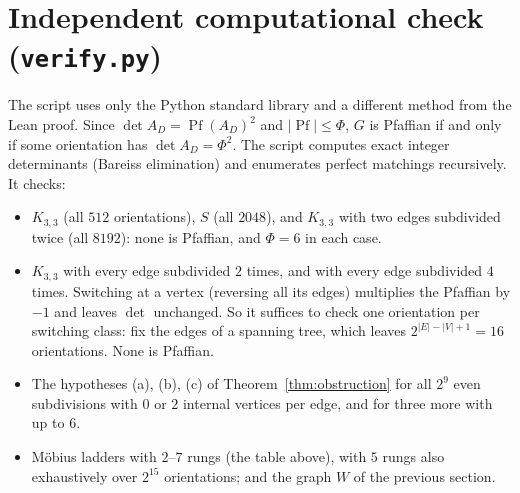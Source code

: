 \documentclass[11pt]{article}
\theoremstyle{definition}
\theoremstyle{remark}
\begin{document}
\section{Independent computational check (\texttt{verify.py})}
The script uses only the Python standard library and a different method from the
Lean proof. Since $\det A_D=\operatorname{Pf}(A_D)^2$ and $|\operatorname{Pf}|\le\Phi$, $G$ is
Pfaffian if and only if some orientation has $\det A_D=\Phi^2$. The script computes
exact integer determinants (Bareiss elimination) and enumerates perfect matchings
recursively. It checks:
\begin{itemize}
\item $K_{3,3}$ (all $512$ orientations), $S$ (all $2048$), and $K_{3,3}$ with two
edges subdivided twice (all $8192$): none is Pfaffian, and $\Phi=6$ in each case.
\item $K_{3,3}$ with every edge subdivided $2$ times, and with every edge subdivided
$4$ times. Switching at a vertex (reversing all its edges) multiplies the
Pfaffian by $-1$ and leaves $\det$ unchanged. So it suffices to check one
orientation per switching class: fix the edges of a spanning tree, which leaves
$2^{|E|-|V|+1}=16$ orientations. None is Pfaffian.
\item The hypotheses (a), (b), (c) of Theorem~\ref{thm:obstruction} for all $2^9$ even
subdivisions with $0$ or $2$ internal vertices per edge, and for three more with
up to $6$.
\item M\"obius ladders with $2$--$7$ rungs (the table above), with $5$ rungs also
exhaustively over $2^{15}$ orientations; and the graph $W$ of the previous
section.
\end{itemize}
\end{document}

